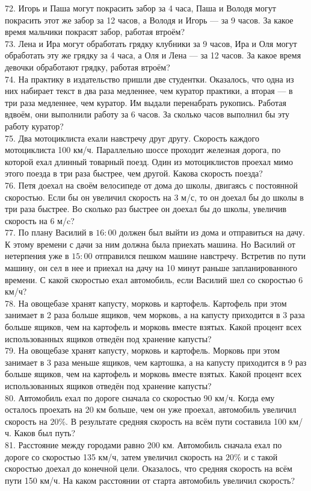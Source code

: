 \documentclass[12pt]{article}
\begin{document}
72. Игорь и Паша могут покрасить забор за 4 часа, Паша и Володя могут покрасить этот же забор за 12 часов, а Володя и Игорь --- за 9 часов. За какое время мальчики покрасят забор, работая втроём?\\
73. Лена и Ира могут обработать грядку клубники за 9 часов, Ира и Оля могут обработать эту же грядку за 4 часа, а Оля и Лена --- за 12 часов. За какое время девочки обработают грядку, работая втроём?\\
74. На практику в издательство пришли две студентки. Оказалось, что одна из них набирает текст в два раза медленнее, чем куратор практики, а вторая --- в три раза медленнее, чем куратор. Им выдали перенабрать рукопись. Работая вдвоём, они выполнили работу за 6 часов. За сколько часов выполнил бы эту работу куратор?\\
75. Два мотоциклиста ехали навстречу друг другу. Скорость каждого мотоциклиста 100 км/ч. Параллельно шоссе проходит железная дорога, по которой ехал длинный товарный поезд. Один из мотоциклистов проехал мимо этого поезда в три раза быстрее, чем другой. Какова скорость поезда?\\
76. Петя доехал на своём велосипеде от дома до школы, двигаясь с постоянной скоростью. Если бы он увеличил скорость на 3 м/с, то он доехал бы до школы в три раза быстрее. Во сколько раз быстрее он доехал бы до школы, увеличив скорость на 6 м/c?\\
77. По плану Василий в $16:00$ должен был выйти из дома и отправиться на дачу. К этому времени с дачи за ним должна была приехать машина. Но Василий от нетерпения уже в $15:00$ отправился пешком машине навстречу. Встретив по пути машину, он сел в нее и приехал на дачу на 10 минут раньше запланированного времени. С какой скоростью ехал автомобиль, если Василий шел со скоростью 6 км/ч?\\
78. На овощебазе хранят капусту, морковь и картофель. Картофель при этом занимает в 2 раза больше ящиков, чем морковь, а на капусту приходится в 3 раза больше ящиков, чем на картофель и морковь вместе взятых. Какой процент всех использованных ящиков отведён под хранение капусты?\\
79. На овощебазе хранят капусту, морковь и картофель. Морковь при этом занимает в 3 раза меньше ящиков, чем картошка, а на капусту приходится в 9 раз больше ящиков, чем на картофель и морковь вместе взятых. Какой процент всех использованных ящиков отведён под хранение капусты?\\
80. Автомобиль ехал по дороге сначала со скоростью 90 км/ч. Когда ему осталось проехать на
20 км больше, чем он уже проехал, автомобиль увеличил скорость на $20\%.$ В результате средняя
скорость на всём пути составила 100 км/ч. Каков был путь?\\
81.  Расстояние между городами равно 200 км. Автомобиль сначала ехал по дороге со скоростью
135 км/ч, затем увеличил скорость на $20\%$ и с такой скоростью доехал до конечной цели. Оказалось,
что средняя скорость на всём пути 150 км/ч. На каком расстоянии от старта автомобиль увеличил
скорость?
\newpage
\end{document}
